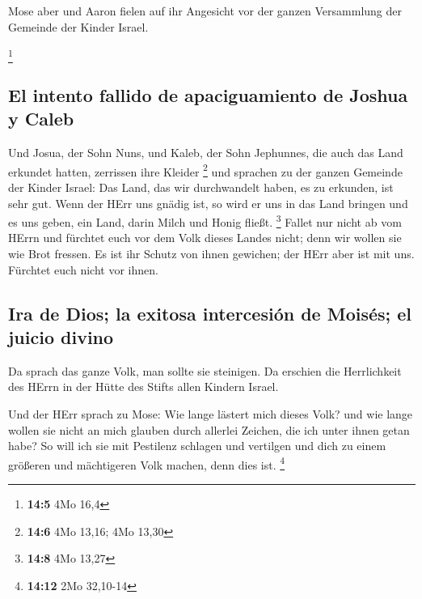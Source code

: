  Mose aber und Aaron fielen auf ihr Angesicht vor der
ganzen Versammlung der Gemeinde der Kinder Israel.

\footnote{\textbf{14:5} 4Mo 16,4}

\hypertarget{el-intento-fallido-de-apaciguamiento-de-joshua-y-caleb}{%
\subsection{El intento fallido de apaciguamiento de Joshua y
Caleb}\label{el-intento-fallido-de-apaciguamiento-de-joshua-y-caleb}}

 Und Josua, der Sohn Nuns, und Kaleb, der Sohn Jephunnes,
die auch das Land erkundet hatten, zerrissen ihre Kleider \footnote{\textbf{14:6}
  4Mo 13,16; 4Mo 13,30}  und sprachen zu der ganzen
Gemeinde der Kinder Israel: Das Land, das wir durchwandelt haben, es zu
erkunden, ist sehr gut.  Wenn der HErr uns gnädig ist, so
wird er uns in das Land bringen und es uns geben, ein Land, darin Milch
und Honig fließt. \footnote{\textbf{14:8} 4Mo 13,27} 
Fallet nur nicht ab vom HErrn und fürchtet euch vor dem Volk dieses
Landes nicht; denn wir wollen sie wie Brot fressen. Es ist ihr Schutz
von ihnen gewichen; der HErr aber ist mit uns. Fürchtet euch nicht vor
ihnen.

\hypertarget{ira-de-dios-la-exitosa-intercesiuxf3n-de-moisuxe9s-el-juicio-divino}{%
\subsection{Ira de Dios; la exitosa intercesión de Moisés; el juicio
divino}\label{ira-de-dios-la-exitosa-intercesiuxf3n-de-moisuxe9s-el-juicio-divino}}

 Da sprach das ganze Volk, man sollte sie steinigen. Da
erschien die Herrlichkeit des HErrn in der Hütte des Stifts allen
Kindern Israel.

 Und der HErr sprach zu Mose: Wie lange lästert mich
dieses Volk? und wie lange wollen sie nicht an mich glauben durch
allerlei Zeichen, die ich unter ihnen getan habe?  So
will ich sie mit Pestilenz schlagen und vertilgen und dich zu einem
größeren und mächtigeren Volk machen, denn dies ist. \footnote{\textbf{14:12}
  2Mo 32,10-14}

